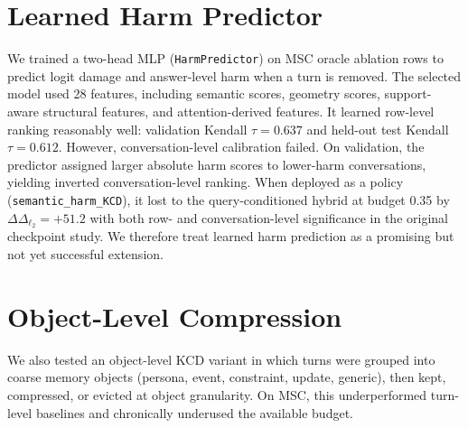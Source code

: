 \documentclass[11pt]{article}
\newcommand{\Logit}{\Delta_{\ell_2}}
\newcommand{\pname}[1]{\texttt{\small #1}}
\begin{document}
\begin{table}[h]
\centering
\caption{Conversation-state geometry summary across compact model families.}
\label{tab:geometry_summary}
\end{table}

\section{Learned Harm Predictor}
We trained a two-head MLP (\texttt{HarmPredictor}) on MSC oracle ablation rows to predict logit damage and answer-level harm when a turn is removed. The selected model used 28 features, including semantic scores, geometry scores, support-aware structural features, and attention-derived features. It learned row-level ranking reasonably well: validation Kendall $\tau = 0.637$ and held-out test Kendall $\tau = 0.612$. However, conversation-level calibration failed. On validation, the predictor assigned larger absolute harm scores to lower-harm conversations, yielding inverted conversation-level ranking. When deployed as a policy (\pname{semantic\_harm\_KCD}), it lost to the query-conditioned hybrid at budget 0.35 by $\Delta\Logit = +51.2$ with both row- and conversation-level significance in the original checkpoint study. We therefore treat learned harm prediction as a promising but not yet successful extension.

\section{Object-Level Compression}
We also tested an object-level KCD variant in which turns were grouped into coarse memory objects (persona, event, constraint, update, generic), then kept, compressed, or evicted at object granularity. On MSC, this underperformed turn-level baselines and chronically underused the available budget.
\end{document}
